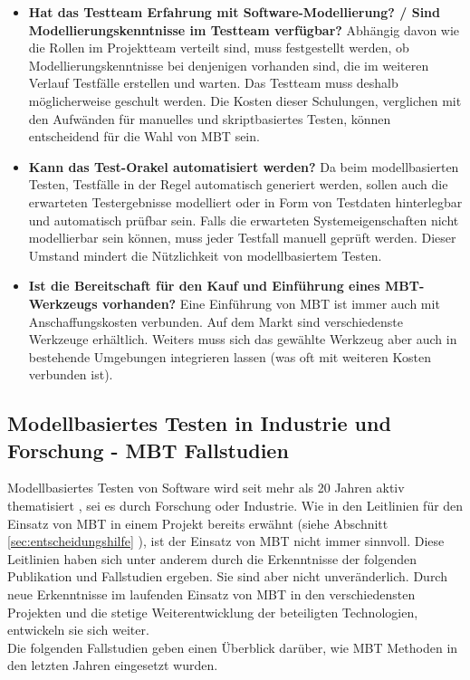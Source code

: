 \begin{itemize}
\item \textbf{Hat das Testteam Erfahrung mit Software-Modellierung? / Sind Modellierungskenntnisse im Testteam verfügbar?}
Abhängig davon wie die Rollen im Projektteam verteilt sind, muss festgestellt werden, ob Modellierungskenntnisse bei denjenigen vorhanden sind, die im weiteren Verlauf Testfälle erstellen und warten. Das Testteam muss deshalb möglicherweise geschult werden. Die Kosten dieser Schulungen, verglichen mit den Aufwänden für manuelles und skriptbasiertes Testen, können entscheidend für die Wahl von \Gls{MBT} sein.
\item \textbf{Kann das Test-Orakel automatisiert werden?}
Da beim modellbasierten Testen, Testfälle in der Regel automatisch generiert werden, sollen auch die erwarteten Testergebnisse modelliert oder in Form von Testdaten hinterlegbar und automatisch prüfbar sein. Falls die erwarteten Systemeigenschaften nicht modellierbar sein können, muss jeder Testfall manuell geprüft werden. Dieser Umstand mindert die Nützlichkeit von modellbasiertem Testen.
\item \textbf{Ist die Bereitschaft für den Kauf und Einführung eines MBT-Werkzeugs vorhanden?}
Eine Einführung von \Gls{MBT} ist immer auch mit Anschaffungskosten verbunden. Auf dem Markt sind verschiedenste Werkzeuge erhältlich. Weiters muss sich das gewählte Werkzeug aber auch in bestehende Umgebungen integrieren lassen (was oft mit weiteren Kosten verbunden ist).
\end{itemize}

\subsection{Modellbasiertes Testen in Industrie und Forschung - \Gls{MBT} Fallstudien}

Modellbasiertes Testen von Software wird seit mehr als 20 Jahren aktiv thematisiert \cite{utting_practical_2007}, sei es durch Forschung oder Industrie. Wie in den Leitlinien für den Einsatz von \Gls{MBT} in einem Projekt bereits erwähnt (siehe Abschnitt \ref{sec:entscheidungshilfe} ), ist der Einsatz von \Gls{MBT} nicht immer sinnvoll. Diese Leitlinien haben sich unter anderem durch die Erkenntnisse der folgenden Publikation und Fallstudien ergeben. Sie sind aber nicht unveränderlich. Durch neue Erkenntnisse im laufenden Einsatz von \Gls{MBT} in den verschiedensten Projekten und die stetige Weiterentwicklung der beteiligten Technologien, entwickeln sie sich weiter.\\
Die folgenden Fallstudien geben einen Überblick darüber, wie \Gls{MBT} Methoden in den letzten Jahren eingesetzt wurden.

